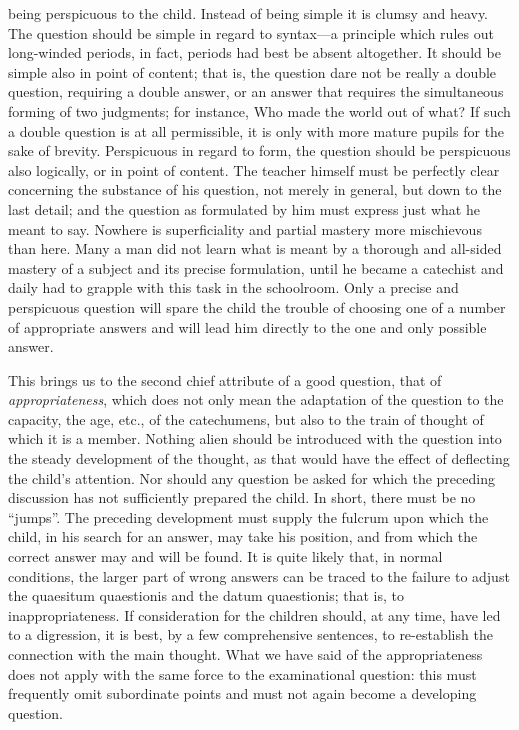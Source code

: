 being perspicuous to the child. Instead of being simple it is clumsy and heavy. The question should be simple in regard to syntax—a principle which rules out long-winded periods, in fact, periods had best be absent altogether. It should be simple also in point of content; that is, the question dare not be really a double question, requiring a double answer, or an answer that requires the simultaneous forming of two judgments; for instance, Who made the world out of what? If such a double question is at all permissible, it is only with more mature pupils for the sake of brevity. Perspicuous in regard to form, the question should be perspicuous also logically, or in point of content. The teacher himself must be perfectly clear concerning the substance of his question, not merely in general, but down to the last detail; and the question as formulated by him must express just what he meant to say. Nowhere is superficiality and partial mastery more mischievous than here. Many a man did not learn what is meant by a thorough and all-sided mastery of a subject and its precise formulation, until he became a catechist and daily had to grapple with this task in the schoolroom. Only a precise and perspicuous question will spare the child the trouble of choosing one of a number of appropriate answers and will lead him directly to the one and only possible answer.

This brings us to the second chief attribute of a good question, that of \emph{appropriateness}, which does not only mean the adaptation of the question to the capacity, the age, etc., of the catechumens, but also to the train of thought of which it is a member. Nothing alien should be introduced with the question into the steady development of the thought, as that would have the effect of deflecting the child’s attention. Nor should any question be asked for which the preceding discussion has not sufficiently prepared the child. In short, there must be no “jumps”. The preceding development must supply the fulcrum upon which the child, in his search for an answer, may
take his position, and from which the correct answer may and will be found. It is quite likely that, in normal conditions, the larger part of wrong answers can be traced to the failure to adjust the quaesitum quaestionis and the datum quaestionis; that is, to inappropriateness. If consideration for the children should, at any time, have led to a digression, it is best, by a few comprehensive sentences, to re-establish the connection with the main thought. What we have said of the appropriateness does not apply with the same force to the examinational question: this must frequently omit subordinate points and must not again become a developing question.

